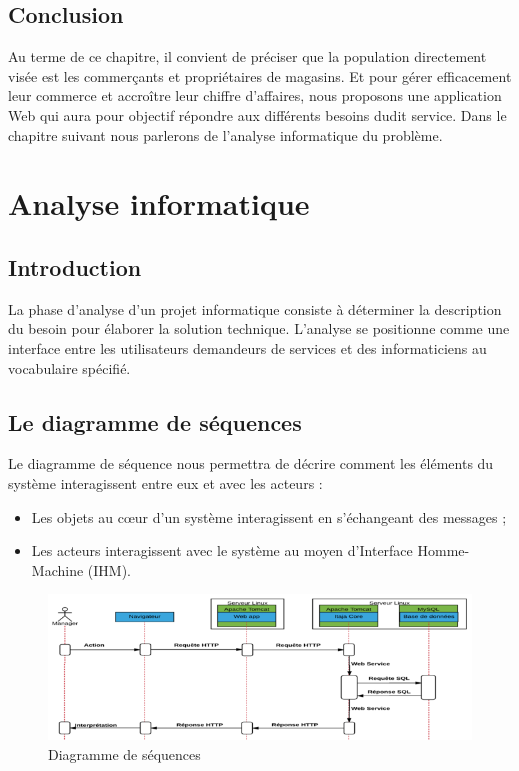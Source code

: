 \documentclass[12pt]{report}
\begin{document}
	
      \section{Conclusion}
      Au terme de ce chapitre, il convient de préciser que la population directement visée est les commerçants et propriétaires de magasins. Et pour gérer efficacement leur commerce et accroître leur chiffre d'affaires, nous proposons une application Web qui aura pour objectif répondre aux différents besoins dudit service. Dans le chapitre suivant nous parlerons de l'analyse informatique du problème.

    \chapter{Analyse informatique}
      \section{Introduction}
	La phase d'analyse d'un projet informatique consiste à déterminer la description du besoin pour élaborer la solution technique. L'analyse se positionne comme une interface entre les utilisateurs demandeurs de services et des informaticiens au vocabulaire spécifié.
	
      \section{Le diagramme de séquences}
      Le diagramme de séquence nous permettra de décrire comment les éléments du système interagissent entre eux et avec les acteurs :
      \begin{itemize}
	\item Les objets au cœur d’un système interagissent en s’échangeant des messages ;
	\item Les acteurs interagissent avec le système au moyen d’Interface Homme-Machine (IHM).
      \end{itemize}

	\begin{figure}[H]
		\begin{center}
		  \includegraphics[scale=0.7]{images/diagrammeSequence.png}
		  \caption{Diagramme de séquences}
		\end{center}
	  \end{figure}
	  
\end{document}
